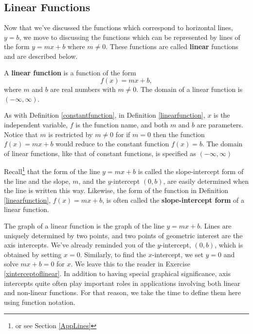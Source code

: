 \subsection{Linear Functions}
\label{LinearFunctions}

Now that we've discussed the functions which correspond to horizontal lines, $y = b$, we move to discussing the functions which can be represented by lines of the form $y = mx + b$ where $m \neq 0$.  These functions are called \textbf{linear} functions and are described below.

\medskip

\colorbox{ResultColor}{\bbm

\begin{defn} \label{linearfunction} 
A \textbf{linear function} is a function of the form \[ f(x) = mx + b,\] where $m$ and $b$ are real numbers with $m \neq 0$.  The domain of a linear function is $(-\infty, \infty)$.

\end{defn}

\ebm}

\medskip

As with Definition \ref{constantfunction},  in Definition \ref{linearfunction}, $x$ is the independent variable, $f$ is the function name, and both $m$ and $b$ are parameters.  Notice that $m$ is restricted by $m \neq 0$ for if $m = 0$ then the function $f(x) = mx + b$ would reduce to the constant function $f(x) = b$.  The domain of linear functions, like that of constant functions,  is specified as $(-\infty, \infty)$

\medskip

Recall\footnote{or see Section \ref{AppLines}} that the form of the line $y = mx + b$ is called the slope-intercept form of the line and the slope,  $m$, and the $y$-intercept $(0, b)$, are easily determined when the line is written this way. Likewise, the form of the function in Definition \ref{linearfunction}, $f(x) = mx + b$, is often called the  \textbf{slope-intercept form} of a linear function.

\medskip

The graph of a linear function is the graph of the line  $y = mx + b$.   Lines are uniquely determined by two points, and two points of geometric interest are the axis intercepts.  We've already reminded you of the $y$-intercept, $(0,b)$, which is obtained by setting $x = 0$. Similarly, to find the $x$-intercept, we set $y = 0$ and solve $mx + b = 0$ for $x$.  We leave this to the reader in Exercise \ref{xinterceptoflinear}.  In addition to having special graphical significance, axis intercepts quite often play important roles in applications involving both linear and non-linear functions.   For that reason, we take the time to define them here using function notation.

